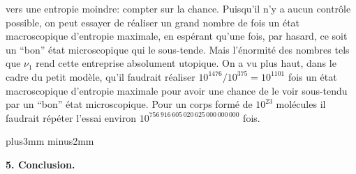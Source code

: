 vers une entropie moindre: compter sur la chance.  Puisqu'il n'y a aucun 
contr\^ole possible, on peut essayer de r\'ealiser un grand nombre de 
fois un \'etat macroscopique d'entropie maximale,  en esp\'erant qu'une fois, 
par hasard, ce soit un ``bon'' \'etat microscopique qui le sous-tende. 
Mais l'\'enormit\'e des nombres tels que $\nu_1$ rend cette entreprise 
absolument utopique.  On a vu plus haut,  dans le cadre du petit mod\`ele, 
qu'il faudrait r\'ealiser $10^{1476} / 10^{375} = 10^{1101}$ fois un \'etat
macroscopique d'entropie maximale pour avoir une chance de le voir 
sous-tendu par un ``bon'' \'etat microscopique. Pour un corps form\'e 
de $10^{23}$ mol\'ecules il faudrait r\'ep\'eter l'essai environ 
$10^{756\, 916\, 605\, 020\, 625\, 000\, 000\, 000}$ fois.

\vskip6mm plus3mm minus2mm

{ \bf 5. Conclusion.}

